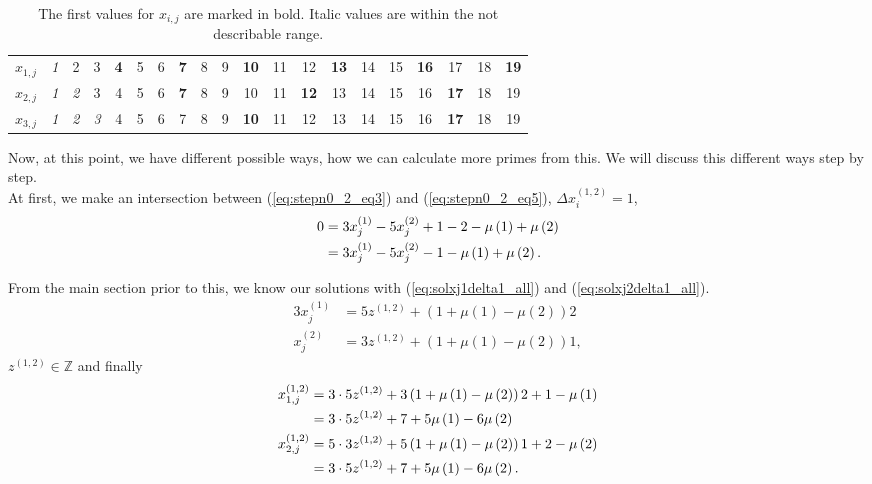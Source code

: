 \begin{table}[H]
\centering
\caption{The first values for $x_{i,j}$ are marked in bold. Italic values are within the not describable range.}
\begin{tabular}{c|ccccccccccccccccccc}
\hline	$x_{1,j}$ & \textit{1} & 2 & 3 & \textbf{4} & 5 & 6 & \textbf{7} & 8 & 9 & \textbf{10} & 11 & 12 & \textbf{13} & 14 & 15 & \textbf{16} & 17 & 18 & \textbf{19} \\
	$x_{2,j}$ & \textit{1} & \textit{2} & 3 & 4 & 5 & 6 & \textbf{7} & 8 & 9 & 10 & 11 & \textbf{12} & 13 & 14 & 15 & 16 & \textbf{17} & 18 & 19 \\
	$x_{3,j}$ & \textit{1} & \textit{2} & \textit{3} & 4 & 5 & 6 & 7 & 8 & 9 & \textbf{10} & 11 & 12 & 13 & 14 & 15 & 16 & \textbf{17} & 18 & 19
\end{tabular}
\label{tab:stepn0_2_values357}
\end{table}

Now, at this point, we have different possible ways, how we can calculate more primes from this. We will discuss this different ways step by step.\\
At first, we make an intersection between (\ref{eq:stepn0_2_eq3}) and (\ref{eq:stepn0_2_eq5}), $\Delta x_{i}^{\left(1,2\right)} = 1$,
\begin{alignat}{3}
	0 &= 3x_{j}^{\left(1\right)} - 5x_{j}^{\left(2\right)} + 1 - 2 - \mu\left(1\right)  + \mu\left(2\right) \notag \\
	  &= 3x_{j}^{\left(1\right)} - 5x_{j}^{\left(2\right)} - 1 - \mu\left(1\right)  + \mu\left(2\right). \label{eq:step0_2_int35}
\end{alignat}

From the main section prior to this, we know our solutions with (\ref{eq:solxj1delta1_all}) and (\ref{eq:solxj2delta1_all}).
\begin{alignat}{3}
	x_{j}^{\left(1\right)} &= 5z^{\left(1,2\right)} + \left(1 + \mu\left(1\right) - \mu\left(2\right)\right)2 \label{eq:step0_2_sol35_1} \\
	x_{j}^{\left(2\right)} &= 3z^{\left(1,2\right)} + \left(1 + \mu\left(1\right) - \mu\left(2\right)\right)1 \label{eq:step0_2_sol35_2},
\end{alignat}
$z^{\left(1,2\right)} \in \mathbb{Z}$ and finally
\begin{alignat}{3}
	x_{1,j}^{\left(1,2\right)} &= 3 \cdot 5 z^{\left(1,2\right)} + 3\left(1 + \mu\left(1\right) - \mu\left(2\right)\right)2 + 1 - \mu\left(1\right) \label{eq:step0_2_sol35_x1j_12_l1} \\
	&= 3 \cdot 5 z^{\left(1,2\right)} + 7 + 5\mu\left(1\right) - 6\mu\left(2\right) \label{eq:step0_2_sol35_x1j_12_l2} \\
	x_{2,j}^{\left(1,2\right)} &= 5 \cdot 3 z^{\left(1,2\right)} + 5\left(1 + \mu\left(1\right) - \mu\left(2\right)\right)1 + 2 - \mu\left(2\right) \label{eq:step0_2_sol35_x2j_12_l1} \\
	&= 3 \cdot 5 z^{\left(1,2\right)} + 7 + 5\mu\left(1\right) - 6\mu\left(2\right). \notag %
\end{alignat}

